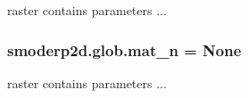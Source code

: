 raster contains parameters ... 

\hypertarget{namespacesmoderp2d_1_1glob_a374271c83af8083fa6a1b0f349f0b0bd}{
\subsubsection[{mat\-\_\-n}]{\setlength{\rightskip}{0pt plus 5cm}smoderp2d.\-glob.\-mat\-\_\-n = None}}\label{namespacesmoderp2d_1_1glob_a374271c83af8083fa6a1b0f349f0b0bd}


raster contains parameters ... 

